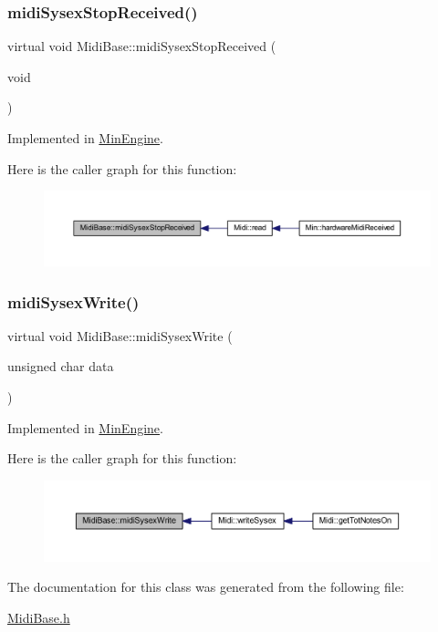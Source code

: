\subsubsection{\texorpdfstring{midi\+Sysex\+Stop\+Received()}{midiSysexStopReceived()}}
{\footnotesize\ttfamily virtual void Midi\+Base\+::midi\+Sysex\+Stop\+Received (\begin{DoxyParamCaption}\item[{void}]{ }\end{DoxyParamCaption})\hspace{0.3cm}{\ttfamily [pure virtual]}}



Implemented in \hyperlink{class_min_engine_a1378bc2f4ad5d072392a498f5ef9e8e8}{Min\+Engine}.

Here is the caller graph for this function\+:
\nopagebreak
\begin{figure}[H]
\begin{center}
\leavevmode
\includegraphics[width=350pt]{de/def/class_midi_base_a14d11f47e731a26535f855a99893d092_icgraph}
\end{center}
\end{figure}
\mbox{\label{class_midi_base_a747dece3a9e16a13766073d9e675887b}} 
\subsubsection{\texorpdfstring{midi\+Sysex\+Write()}{midiSysexWrite()}}
{\footnotesize\ttfamily virtual void Midi\+Base\+::midi\+Sysex\+Write (\begin{DoxyParamCaption}\item[{unsigned char}]{data }\end{DoxyParamCaption})\hspace{0.3cm}{\ttfamily [pure virtual]}}



Implemented in \hyperlink{class_min_engine_a10593d7e2c9bc02a3cffa92a522da294}{Min\+Engine}.

Here is the caller graph for this function\+:
\nopagebreak
\begin{figure}[H]
\begin{center}
\leavevmode
\includegraphics[width=350pt]{de/def/class_midi_base_a747dece3a9e16a13766073d9e675887b_icgraph}
\end{center}
\end{figure}


The documentation for this class was generated from the following file\+:\begin{DoxyCompactItemize}
\item 
\hyperlink{_midi_base_8h}{Midi\+Base.\+h}\end{DoxyCompactItemize}
